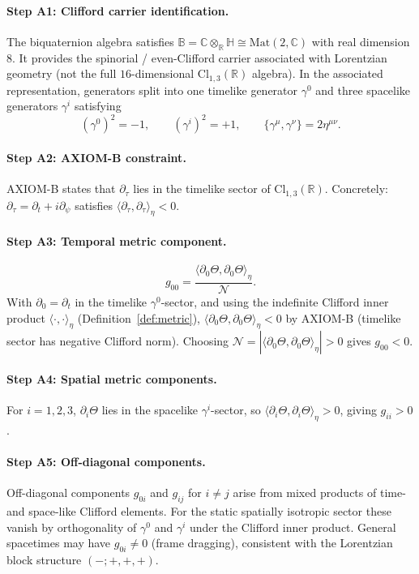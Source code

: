 \documentclass[12pt,a4paper]{article}
\theoremstyle{definition}
\theoremstyle{remark}
\newcommand{\BB}{\mathbb{B}}
\newcommand{\CC}{\mathbb{C}}
\newcommand{\RR}{\mathbb{R}}
\newcommand{\HH}{\mathbb{H}}
\newcommand{\calN}{\mathcal{N}}
\begin{document}
\paragraph{Step A1: Clifford carrier identification.}
The biquaternion algebra satisfies
$\BB = \CC\otimes_\RR\HH \cong \mathrm{Mat}(2,\CC)$
with real dimension $8$. It provides the spinorial / even-Clifford carrier
associated with Lorentzian geometry (not the full $16$-dimensional
$\mathrm{Cl}_{1,3}(\RR)$ algebra). In the associated representation, generators split into one timelike generator
$\gamma^0$ and three spacelike generators $\gamma^i$ satisfying
\[
  (\gamma^0)^2 = -1, \qquad
  (\gamma^i)^2 = +1, \qquad
  \{\gamma^\mu,\gamma^\nu\} = 2\eta^{\mu\nu}.
\]

\paragraph{Step A2: AXIOM-B constraint.}
AXIOM-B states that $\partial_\tau$ lies in the timelike sector of
$\mathrm{Cl}_{1,3}(\RR)$.
Concretely: $\partial_\tau = \partial_t + i\partial_\psi$ satisfies
$\langle\partial_\tau,\partial_\tau\rangle_\eta < 0$.

\paragraph{Step A3: Temporal metric component.}
\[
  g_{00}
  = \frac{\langle \partial_0\Theta,\partial_0\Theta \rangle_\eta}{\calN}.
\]
With $\partial_0 = \partial_t$ in the timelike $\gamma^0$-sector,
and using the indefinite Clifford inner product
$\langle\cdot,\cdot\rangle_\eta$ (Definition~\ref{def:metric}),
$\langle\partial_0\Theta, \partial_0\Theta\rangle_\eta < 0$
by AXIOM-B (timelike sector has negative Clifford norm).
Choosing $\calN = |\langle\partial_0\Theta,\partial_0\Theta\rangle_\eta| > 0$
gives $g_{00} < 0$.

\paragraph{Step A4: Spatial metric components.}
For $i = 1,2,3$, $\partial_i\Theta$ lies in the spacelike $\gamma^i$-sector,
so $\langle\partial_i\Theta,\partial_i\Theta\rangle_\eta > 0$,
giving $g_{ii} > 0$.

\paragraph{Step A5: Off-diagonal components.}
Off-diagonal components $g_{0i}$ and $g_{ij}$ for $i \neq j$ arise from
mixed products of time- and space-like Clifford elements.
For the static spatially isotropic sector these vanish by orthogonality
of $\gamma^0$ and $\gamma^i$ under the Clifford inner product.
General spacetimes may have $g_{0i} \neq 0$ (frame dragging), consistent
with the Lorentzian block structure $(-;+,+,+)$.
\end{document}
